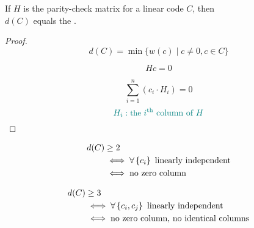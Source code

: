\begin{frame}{}
  \begin{theorem}
	\begin{center}
	  If $H$ is the parity-check matrix for a linear code $C$, then \\
	  $d(C)$ equals the .
	\end{center}
  \end{theorem}

  \begin{proof}
	\pause
	\[
	  d(C) = \min \big\{ w(c) \mid c \neq 0, c \in C \big\}
	\]

	\pause
	\[
	  H c = 0
	\]

	\pause
	\[
	  \sum_{i=1}^{n} (c_i \cdot H_i) = 0 
	\]
	\[
	  \textcolor{teal}{H_i: \text{\small the } i^{\text{th}} \text{ column of } H}
	\]
  \end{proof}
\end{frame}

\begin{frame}{}
  \begin{theorem}
	\vspace{-0.40cm}
	\begin{align*}
		d(C) &\ge 2 \\
		&\iff \forall \left\{ c_i \right\} \text{ linearly independent} \\
		&\iff \text{no zero column}
	\end{align*}
  \end{theorem}

  \pause
  \vspace{0.60cm}
  \begin{theorem}
	\vspace{-0.40cm}
	\begin{align*}
		d(C) &\ge 3 \\
		&\iff \forall \left\{ c_i, c_j \right\} \text{ linearly independent} \\
		&\iff \text{no zero column, no identical columns}
	\end{align*}
  \end{theorem}
\end{frame}

